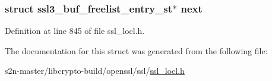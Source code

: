 \subsubsection[{\texorpdfstring{next}{next}}]{\setlength{\rightskip}{0pt plus 5cm}struct {\bf ssl3\+\_\+buf\+\_\+freelist\+\_\+entry\+\_\+st}$\ast$ next}\hypertarget{structssl3__buf__freelist__entry__st_a1ba48f1eac6f6ceabd7864a71cbf58b2}{}\label{structssl3__buf__freelist__entry__st_a1ba48f1eac6f6ceabd7864a71cbf58b2}


Definition at line 845 of file ssl\+\_\+locl.\+h.



The documentation for this struct was generated from the following file\+:\begin{DoxyCompactItemize}
\item 
s2n-\/master/libcrypto-\/build/openssl/ssl/\hyperlink{ssl__locl_8h}{ssl\+\_\+locl.\+h}\end{DoxyCompactItemize}
